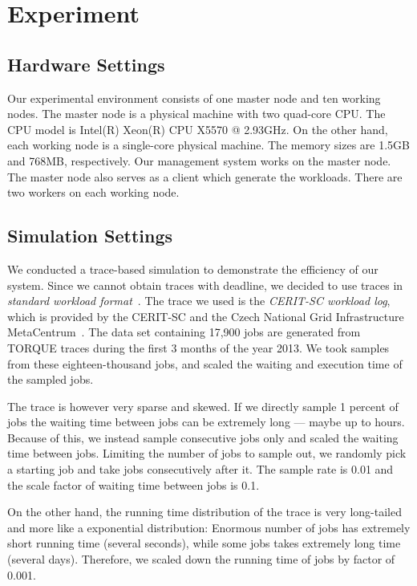 \section{Experiment}\label{sec:exp}

\subsection{Hardware Settings}

Our experimental environment consists of one master node and ten working nodes.
The master node is a physical machine with two quad-core CPU.
The CPU model is Intel(R) Xeon(R) CPU X5570 @ 2.93GHz.
On the other hand, each working node is a single-core physical machine.
The memory sizes are 1.5GB and 768MB, respectively.
Our management system works on the master node.
The master node also serves as a client which generate the workloads.
There are two workers on each working node.

\subsection{Simulation Settings}

We conducted a trace-based simulation to demonstrate the efficiency of
our system.
Since we cannot obtain traces with deadline, we decided to use traces in
{\em standard workload format}~\cite{cite:swf}.
The trace we used is the {\em CERIT-SC workload log}, which is provided
by the CERIT-SC and the Czech National Grid Infrastructure
MetaCentrum~\cite{cite:metacentrum}.
The data set containing 17,900 jobs are generated from TORQUE traces
during the first 3 months of the year 2013.
We took samples from these eighteen-thousand jobs, and scaled the
waiting and execution time of the sampled jobs.

The trace is however very sparse and skewed.
If we directly sample 1 percent of jobs the waiting time between jobs
can be extremely long --- maybe up to hours.
Because of this, we instead sample consecutive jobs only and scaled the
waiting time between jobs.
Limiting the number of jobs to sample out, we randomly pick a starting
job and take jobs consecutively after it. 
The sample rate is 0.01 and the scale factor of waiting time between
jobs is 0.1.

On the other hand, the running time distribution of the trace is very
long-tailed and more like a exponential distribution: Enormous number of
jobs has extremely short running time (several seconds), while some jobs
takes extremely long time (several days).
Therefore, we scaled down the running time of jobs by factor of 0.001.

